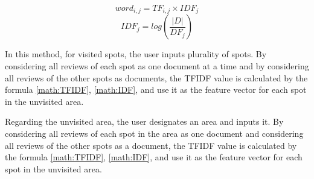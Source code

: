 \documentclass[journal]{IAENGtran}
\begin{document}
\begin{equation}
  word_{i,j} = TF_{i,j} \times IDF_{j}
  \label{math:TFIDF}
\end{equation}
\begin{equation}
  IDF_{j} = log(\frac{|D|}{DF_{j}})
  \label{math:IDF}
\end{equation}

In this method, for visited spots, the user inputs plurality of spots.
By considering all reviews of each spot as one document at a time and by considering all reviews of the other spots as documents, the TFIDF value is calculated by the formula \ref{math:TFIDF}, \ref{math:IDF}, and use it as the feature vector for each spot in the unvisited area.

Regarding the unvisited area, the user designates an area and inputs it.
By considering all reviews of each spot in the area as one document and considering all reviews of the other spots as a document, the TFIDF value is calculated by the formula \ref{math:TFIDF}, \ref{math:IDF}, and use it as the feature vector for each spot in the unvisited area.

\end{document}
